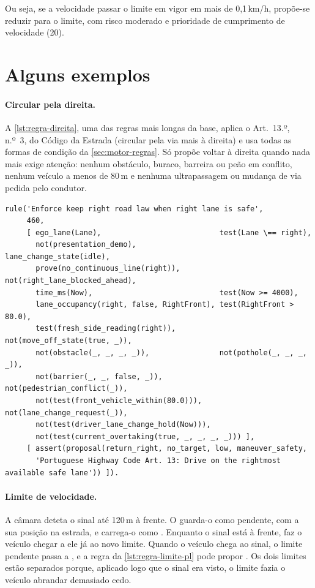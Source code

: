 Ou seja, se a velocidade passar o limite em vigor em mais de 0,1\,km/h,
propõe-se reduzir para o limite, com risco moderado e prioridade de cumprimento
de velocidade (20).


\section{Alguns exemplos}
\label{sec:base-exemplos}

\paragraph{Circular pela direita.} A \cref{lst:regra-direita}, uma das regras mais longas da base, aplica o Art.~13.º, n.º~3,
do Código da Estrada (circular pela via mais à direita) e usa todas as formas de
condição da \cref{sec:motor-regras}. Só propõe voltar à direita quando nada mais
exige atenção: nenhum obstáculo, buraco, barreira ou
peão em conflito, nenhum veículo a menos de 80\,m e nenhuma ultrapassagem ou
mudança de via pedida pelo condutor.

\noindent\begin{minipage}{\linewidth}
\begin{lstlisting}[caption={Uma das regras mais longas da base de conhecimento (\texttt{driving\_rules.pl})},label=lst:regra-direita]
rule('Enforce keep right road law when right lane is safe',
     460,
     [ ego_lane(Lane),                           test(Lane \== right),
       not(presentation_demo),                   lane_change_state(idle),
       prove(no_continuous_line(right)),         not(right_lane_blocked_ahead),
       time_ms(Now),                             test(Now >= 4000),
       lane_occupancy(right, false, RightFront), test(RightFront > 80.0),
       test(fresh_side_reading(right)),          not(move_off_state(true, _)),
       not(obstacle(_, _, _, _)),                not(pothole(_, _, _, _)),
       not(barrier(_, _, false, _)),             not(pedestrian_conflict(_)),
       not(test(front_vehicle_within(80.0))),    not(lane_change_request(_)),
       not(test(driver_lane_change_hold(Now))),
       not(test(current_overtaking(true, _, _, _, _))) ],
     [ assert(proposal(return_right, no_target, low, maneuver_safety,
       'Portuguese Highway Code Art. 13: Drive on the rightmost available safe lane')) ]).
\end{lstlisting}
\end{minipage}

\paragraph{Limite de velocidade.} A câmara deteta o sinal até 120\,m à frente.
O  guarda-o como pendente, com a sua posição na estrada, e
carrega-o como . Enquanto o sinal
está à frente,  faz o veículo
chegar a ele já ao novo limite. Quando o veículo chega ao sinal, o limite
pendente passa a , e a regra da
\cref{lst:regra-limite-pl} pode propor . Os dois limites estão
separados porque, aplicado logo que o sinal era visto, o limite fazia o veículo
abrandar demasiado cedo.

